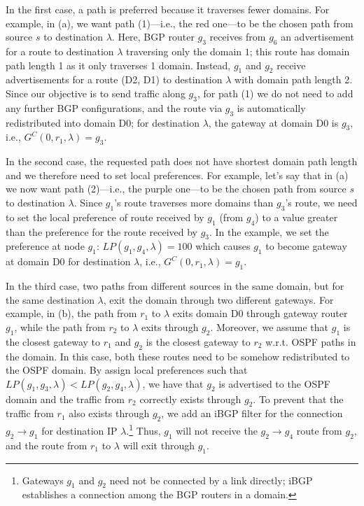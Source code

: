 In the first case, a path is preferred because it traverses fewer domains.
For example, in (a), we want
path (1)---i.e., the red one---to be the chosen path from source $s$ 
to destination $\lambda$.
Here, BGP router $g_3$ receives from $g_6$ an advertisement for a route to destination $\lambda$
traversing only the domain $1$; this route has domain path length 1 as it only traverses 1 domain. 
Instead, $g_1$ and $g_2$ receive advertisements for a route 
(D2, D1)
to destination $\lambda$  with 
domain path length 2. Since our objective is to send traffic along
$g_3$, for path (1) we do not need to add any further BGP configurations,
and the route via $g_3$ is automatically redistributed into domain D0;
for destination $\lambda$, the gateway at domain D0 is $g_3$, i.e.,
$G^C(0, r_1, \lambda) = g_3$.

In the second case, the requested path does not have shortest domain path length
and we therefore need to set local preferences.
For example, let's say that in (a) we now want
path (2)---i.e., the purple one---to be the chosen path from source $s$
to destination $\lambda$. 
Since $g_1$'s route traverses more domains than
 $g_3$'s route,
we need to set the local preference of route received by $g_1$ 
(from $g_4$) to a value greater than the preference for the route received by $g_3$. 
In the example, we set the preference at node $g_1$: 
$LP(g_1, g_4, \lambda) = 100$
which causes $g_1$ to become gateway at domain D0 for destination $\lambda$, i.e., 
$G^C(0, r_1, \lambda) = g_1$.

In the third case, two paths from different sources in the same domain, but for the same destination $\lambda$, exit 
the domain through two different
gateways.
For example, in (b),
the path from $r_1$ to $\lambda$ exits domain D0 through 
gateway router $g_1$, while the path from $r_2$  to $\lambda$ exits 
through $g_2$. 
Moreover,  we assume that $g_1$ is the closest gateway to $r_1$ and 
$g_2$ is the closest gateway to $r_2$ w.r.t. OSPF paths in the domain.
In this case, both these routes need to be 
somehow redistributed to the OSPF domain. 
By assign local preferences such that
$LP(g_1,g_3,\lambda)<LP(g_2,g_4,\lambda)$,
we have that $g_2$ is advertised to the OSPF domain
and
the traffic from $r_2$ correctly exists through $g_2$. 
To prevent that the traffic from $r_1$ also exists through $g_2$,
we add an iBGP filter for the connection $g_2 \rightarrow g_1$ for
destination IP $\lambda$.\footnote{Gateways $g_1$ and $g_2$ need not be connected by a 
link directly; iBGP establishes a connection among the 
BGP routers in a domain.} Thus, $g_1$ will not receive the
$g_2 \rightarrow g_4$ route from $g_2$, 
and the route from  $r_1$ to $\lambda$ will exit through $g_1$.

